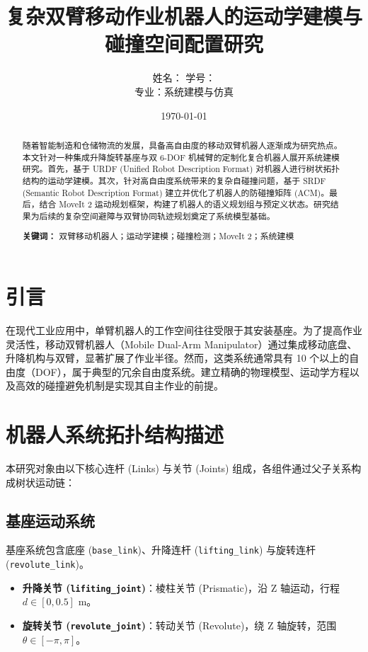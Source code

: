 \documentclass[12pt,a4paper]{article}
\title{\textbf{复杂双臂移动作业机器人的运动学建模与碰撞空间配置研究}}
\author{姓名：\underline{\hspace{2cm}} \quad 学号：\underline{\hspace{3cm}} \\ 专业：系统建模与仿真}
\date{\today}
\begin{document}
\maketitle

\begin{abstract}
随着智能制造和仓储物流的发展，具备高自由度的移动双臂机器人逐渐成为研究热点。本文针对一种集成升降旋转基座与双 6-DOF 机械臂的定制化复合机器人展开系统建模研究。首先，基于 URDF (Unified Robot Description Format) 对机器人进行树状拓扑结构的运动学建模。其次，针对高自由度系统带来的复杂自碰撞问题，基于 SRDF (Semantic Robot Description Format) 建立并优化了机器人的防碰撞矩阵 (ACM)。最后，结合 MoveIt 2 运动规划框架，构建了机器人的语义规划组与预定义状态。研究结果为后续的复杂空间避障与双臂协同轨迹规划奠定了系统模型基础。

\textbf{关键词：} 双臂移动机器人；运动学建模；碰撞检测；MoveIt 2；系统建模
\end{abstract}

\newpage

\section{引言}
在现代工业应用中，单臂机器人的工作空间往往受限于其安装基座。为了提高作业灵活性，移动双臂机器人（Mobile Dual-Arm Manipulator）通过集成移动底盘、升降机构与双臂，显著扩展了作业半径。然而，这类系统通常具有 10 个以上的自由度（DOF），属于典型的冗余自由度系统。建立精确的物理模型、运动学方程以及高效的碰撞避免机制是实现其自主作业的前提。

\section{机器人系统拓扑结构描述}
本研究对象由以下核心连杆 (Links) 与关节 (Joints) 组成，各组件通过父子关系构成树状运动链：

\subsection{基座运动系统}
基座系统包含底座 (\texttt{base\_link})、升降连杆 (\texttt{lifting\_link}) 与旋转连杆 (\texttt{revolute\_link})。
\begin{itemize}
    \item \textbf{升降关节 (\texttt{lifiting\_joint})}：棱柱关节 (Prismatic)，沿 Z 轴运动，行程 $d \in [0, 0.5]$ m。
    \item \textbf{旋转关节 (\texttt{revolute\_joint})}：转动关节 (Revolute)，绕 Z 轴旋转，范围 $\theta \in [-\pi, \pi]$。
\end{itemize}
\end{document}
